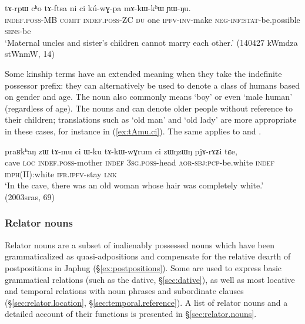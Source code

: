 \begin{exe}
\ex \label{ex:tArpW.tAftsa}
\gll tɤ-rpɯ cʰo tɤ-ftsa ni ci kú-wɣ-pa mɤ-kɯ-kʰɯ ɲɯ-ŋu. \\
\textsc{indef}.\textsc{poss}-MB \textsc{comit} \textsc{indef}.\textsc{poss}-ZC \textsc{du} one \textsc{ipfv}-\textsc{inv}-make \textsc{neg}-\textsc{inf}:\textsc{stat}-be.possible  \textsc{sens}-be \\
\glt `Maternal uncles and sister's children cannot marry each other.'  (140427 kWmdza stWnmW, 14)
\end{exe}

Some kinship terms have an extended meaning when they take the indefinite possessor prefix: they can alternatively be used to denote a class of humans based on gender and age. The noun  also commonly means `boy' or even `male human' (regardless of age). The nouns  and  can denote older people without reference to their children; translations such as `old man' and `old lady' are more appropriate in these cases, for instance in (\ref{ex:tAmu.ci}). The same applies to   and .


\begin{exe}
\ex \label{ex:tAmu.ci}
\gll praʁkʰaŋ  zɯ tɤ-mu ci ɯ-ku tɤ-kɯ-wɣrum ci zɯŋzɯŋ pjɤ-rɤʑi tɕe, \\
cave \textsc{loc} \textsc{indef}.\textsc{poss}-mother \textsc{indef} \textsc{3sg}.\textsc{poss}-head \textsc{aor}-\textsc{sbj}:\textsc{pcp}-be.white \textsc{indef} \textsc{idph}(II):white \textsc{ifr}.\textsc{ipfv}-stay \textsc{lnk} \\
\glt `In the cave, there was an old woman whose hair was completely white.' (2003sras, 69)
\end{exe}

\subsubsection{Relator nouns}
Relator nouns are a subset of inalienably possessed nouns which have been grammaticalized as quasi-adpositions and compensate for the relative dearth of postpositions in Japhug  (§\ref{ex:postpositions}). Some are used to express basic grammatical relations (such as the dative, §\ref{sec:dative}), as well as most locative and temporal relations with noun phrases and subordinate clauses (§\ref{sec:relator.location}, §\ref{sec:temporal.reference}).  A list of relator nouns and a detailed account of their functions is presented in §\ref{sec:relator.nouns}.

